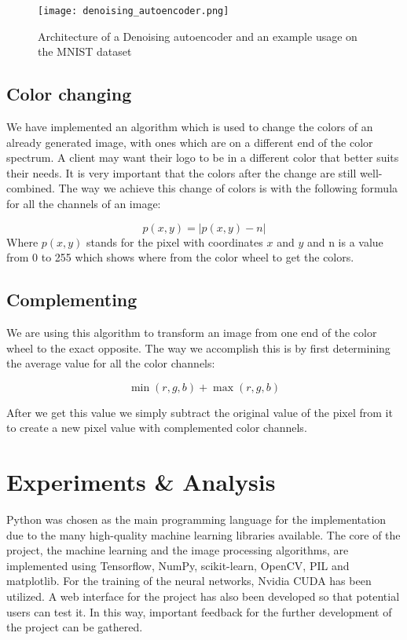 \documentclass{article}
\begin{document}
\begin{figure}[ht]
    \centering
    \texttt{[image: denoising\_autoencoder.png]}
    \caption{Architecture of a Denoising autoencoder and an example usage on the MNIST dataset}
    \label{fig:denoising_autoencoder}
\end{figure}

\subsection{Color changing}
We have implemented an algorithm which is used to change the colors of an already generated image, with ones which are on a different end of the color spectrum. A client may want their logo to be in a different color that better suits their needs. It is very important that the colors after the change are still well-combined. The way we achieve this change of colors is with the following formula for all the channels of an image:

\begin{equation}
p(x, y) = |p(x, y) - n|
\end{equation}
Where $p(x, y)$ stands for the pixel with coordinates $x$ and $y$ and n is a value from 0 to 255 which shows where from the color wheel to get the colors.

\subsection{Complementing}
We are using this algorithm to transform an image from one end of the color wheel to the exact opposite. The way we accomplish this is by first determining the average value for all the color channels:

\begin{equation}
   \min(r, g, b) + \max(r, g, b) 
\end{equation}

After we get this value we simply subtract the original value of the pixel from it to create a new pixel value with complemented color channels.

\section{Experiments \& Analysis}
Python was chosen as the main programming language for the implementation due to the many high-quality machine learning libraries available. The core of the project, the machine learning and the image processing algorithms, are implemented using Tensorflow, NumPy, scikit-learn, OpenCV, PIL and matplotlib. For the training of the neural networks, Nvidia CUDA has been utilized. A web interface for the project has also been developed so that potential users can test it. In this way, important feedback for the further development of the project can be gathered.
\end{document}
